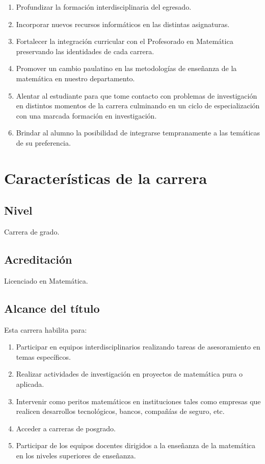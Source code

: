 \documentclass[a4paper, 12pt]{article}
\begin{document}
\begin{enumerate}

    \item Profundizar la  formación interdisciplinaria del
    egresado.
    \item Incorporar nuevos  recursos
    informáticos en las distintas asignaturas.
    \item Fortalecer la integración curricular con el Profesorado
    en Matemática preservando las identidades de cada carrera.
    \item Promover un cambio paulatino en las metodologías de
    enseñanza de la matemática en nuestro departamento.

    \item Alentar al estudiante para que tome contacto con problemas de
    investigación en distintos momentos de la carrera culminando
    en un ciclo de especialización con una marcada formación en
    investigación.

    \item Brindar al alumno la posibilidad de integrarse tempranamente
    a las temáticas de su preferencia.

\end{enumerate}





\section{Características de la carrera}


\subsection{Nivel} Carrera de grado.

\subsection{Acreditación} Licenciado en Matemática.

\subsection{Alcance del título} Esta carrera habilita para:
    \begin{enumerate}

        \item Participar en equipos interdisciplinarios realizando
         tareas de asesoramiento en temas específicos.
        \item  Realizar actividades de investigación en proyectos de matemática
        pura o aplicada.
       \item Intervenir  como peritos matemáticos en instituciones tales como
       empresas que realicen desarrollos tecnológicos, bancos,
       compañías de seguro, etc.
        \item Acceder a carreras de posgrado.
         \item Participar de los equipos docentes dirigidos a la
         enseñanza de la matemática en los niveles superiores de enseñanza.
    \end{enumerate}
\end{document}
